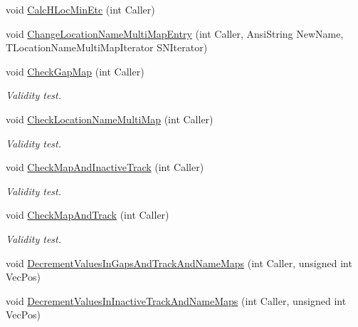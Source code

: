 \begin{DoxyCompactItemize}
void \mbox{\hyperlink{class_t_track_a20a28eaf0308f7aedcfc78ba9eeadea9}{Calc\+H\+Loc\+Min\+Etc}} (int Caller)
\item 
void \mbox{\hyperlink{class_t_track_aa081ea276995a63dfa00fc0ace24f5c5}{Change\+Location\+Name\+Multi\+Map\+Entry}} (int Caller, Ansi\+String New\+Name, T\+Location\+Name\+Multi\+Map\+Iterator S\+N\+Iterator)
\item 
\mbox{\label{class_t_track_a6c4ff502fade845fc1b9011cc4532e3a}} 
void \mbox{\hyperlink{class_t_track_a6c4ff502fade845fc1b9011cc4532e3a}{Check\+Gap\+Map}} (int Caller)
\begin{DoxyCompactList}\small\item\em Validity test. \end{DoxyCompactList}\item 
\mbox{\label{class_t_track_aaf3f48b8df9877499aaf4c05f804426c}} 
void \mbox{\hyperlink{class_t_track_aaf3f48b8df9877499aaf4c05f804426c}{Check\+Location\+Name\+Multi\+Map}} (int Caller)
\begin{DoxyCompactList}\small\item\em Validity test. \end{DoxyCompactList}\item 
\mbox{\label{class_t_track_a6fa2d4f2c6c94e2c6b4f7218f5356108}} 
void \mbox{\hyperlink{class_t_track_a6fa2d4f2c6c94e2c6b4f7218f5356108}{Check\+Map\+And\+Inactive\+Track}} (int Caller)
\begin{DoxyCompactList}\small\item\em Validity test. \end{DoxyCompactList}\item 
\mbox{\label{class_t_track_a4045fe3f4a71f30a137a7e4581d39231}} 
void \mbox{\hyperlink{class_t_track_a4045fe3f4a71f30a137a7e4581d39231}{Check\+Map\+And\+Track}} (int Caller)
\begin{DoxyCompactList}\small\item\em Validity test. \end{DoxyCompactList}\item 
void \mbox{\hyperlink{class_t_track_a2095a52c4b914bf6b29529a2d82043e9}{Decrement\+Values\+In\+Gaps\+And\+Track\+And\+Name\+Maps}} (int Caller, unsigned int Vec\+Pos)
\item 
void \mbox{\hyperlink{class_t_track_af8f925ac5e7301c1094cec76808e1140}{Decrement\+Values\+In\+Inactive\+Track\+And\+Name\+Maps}} (int Caller, unsigned int Vec\+Pos)

\end{DoxyCompactItemize}
